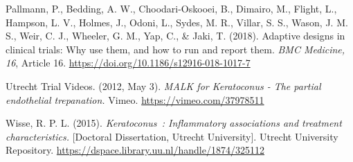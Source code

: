 \documentclass[authordate, reflection,issue]{jote-new-article}
\begin{document}
	Pallmann, P., Bedding, A. W., Choodari-Oskooei, B., Dimairo, M., Flight, L., Hampson, L. V., Holmes, J., Odoni, L., Sydes, M. R., Villar, S. S., Wason, J. M. S., Weir, C. J., Wheeler, G. M., Yap, C., \& Jaki, T. (2018). Adaptive designs in clinical trials: Why use them, and how to run and report them. \emph{BMC Medicine, 16}, Article 16. \url{https://doi.org/10.1186/s12916-018-1017-7}



	Utrecht Trial Videos. (2012, May 3). \emph{MALK for Keratoconus - The partial endothelial trepanation.} Vimeo. \url{https://vimeo.com/37978511}



	Wisse, R. P. L. (2015). \emph{Keratoconus : Inflammatory associations and treatment characteristics.} [Doctoral Dissertation, Utrecht University]. Utrecht University Repository. \url{https://dspace.library.uu.nl/handle/1874/325112}
\end{document}
